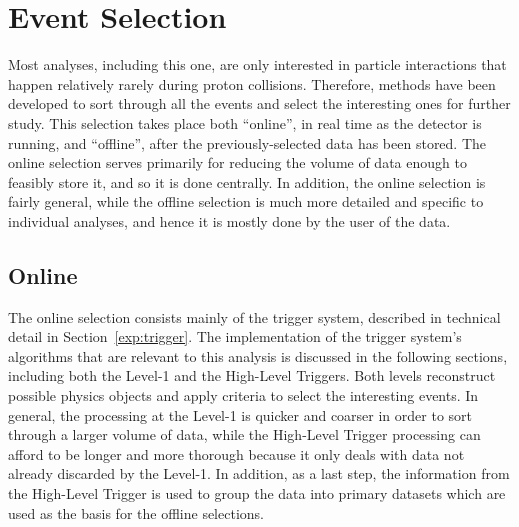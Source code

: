 \newcommand{\AVal}{0.423}
\newcommand{\AEcalVal}{0.387}

\chapter{Event Selection}
\label{evSel}
Most analyses, including this one, are only interested in particle 
interactions that happen relatively rarely during proton collisions.  
Therefore, methods have been developed to sort through all the 
events and select the interesting ones for further study.  
This selection takes place both ``online'', in real time as the 
detector is running, and ``offline'', after the previously-selected data has 
been stored.  
The online selection serves primarily for reducing the 
volume of data enough to feasibly store it, and so it is done centrally. 
In addition, the online selection is fairly general, 
while the offline selection is much more detailed and specific to individual 
analyses, and hence it is mostly done by the user of the data.  


\section{Online}
\label{evSel:online}
The online selection consists mainly of the trigger system, 
described in technical detail in Section~\ref{exp:trigger}.  
The implementation of the trigger system's algorithms 
that are relevant to this analysis 
is discussed in the following sections, 
including both the Level-1 and the High-Level Triggers.  
Both levels reconstruct possible physics objects 
and apply criteria to select the interesting events.  
In general, the processing at the Level-1 is quicker 
and coarser in order to sort through a larger volume of data, 
while the High-Level Trigger processing can afford to be 
longer and more thorough because it only deals with 
data not already discarded by the Level-1.  
In addition, as a last step, the information 
from the High-Level Trigger is used to 
group the data into primary datasets
which are used as the basis for the offline selections.  

